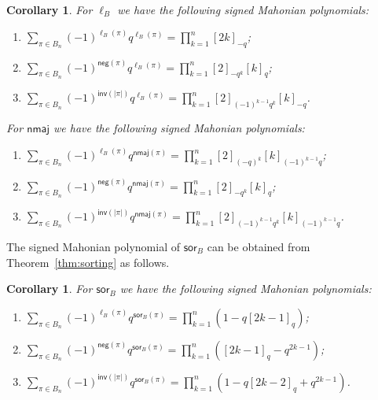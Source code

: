 \documentclass[a4paper, reqno, 11pt]{amsart}
\newtheorem{cor}[lem]{Corollary}
\newcommand{\inv}{{\textsf{inv}}}
\newcommand{\nega}{{\textsf{neg}}}
\newcommand{\nmaj}{{\textsf{nmaj}}}
\newcommand{\sor}{{\textsf{sor}}}
\numberwithin{equation}{section}
\renewcommand{\d}{\displaystyle}
\begin{document}
\begin{cor}
For $\ell_B$ we have the following signed Mahonian polynomials:
\begin{enumerate}

\item $\d\sum_{\pi\in B_n}(-1)^{\ell_B(\pi)}q^{\ell_B(\pi)}=\prod_{k=1}^n[2k]_{-q}$;
\item $\d\sum_{\pi\in B_n}(-1)^{\nega(\pi)}q^{\ell_B(\pi)}=\prod_{k=1}^n[2]_{-q^k}[k]_q$;
\item $\d\sum_{\pi\in B_n}(-1)^{\inv(|\pi|)}q^{\ell_B(\pi)}=\prod_{k=1}^n[2]_{(-1)^{k-1}q^k}[k]_{-q}$.

\end{enumerate}
For $\nmaj$ we have the following signed Mahonian polynomials:
\begin{enumerate}

\item $\d\sum_{\pi\in B_n}(-1)^{\ell_B(\pi)}q^{\nmaj(\pi)} =\prod_{k=1}^n[2]_{(-q)^k}[k]_{(-1)^{k-1}q}$;
\item $\d\sum_{\pi\in B_n}(-1)^{\nega(\pi)}q^{\nmaj(\pi)}=\prod_{k=1}^n[2]_{-q^k}[k]_q$;
\item $\d\sum_{\pi\in B_n}(-1)^{\inv(|\pi|)}q^{\nmaj(\pi)}=\prod_{k=1}^n[2]_{(-1)^{k-1}q^k}[k]_{(-1)^{k-1}q}$.

\end{enumerate}
\end{cor}



The signed Mahonian polynomial of $\sor_B$ can be obtained from Theorem~\ref{thm:sorting} as follows.
\begin{cor}
For $\sor_B$ we have the following signed Mahonian polynomials:
\begin{enumerate}
\item $\d\sum_{\pi\in B_n}(-1)^{\ell_B(\pi)}q^{\sor_B(\pi)}=\prod_{k=1}^n \left( 1-q[2k-1]_q \right)$;
\item $\d\sum_{\pi\in B_n}(-1)^{\nega(\pi)}q^{\sor_B(\pi)}=\prod_{k=1}^n \left( [2k-1]_q-q^{2k-1} \right)$;
\item $\d\sum_{\pi\in B_n}(-1)^{\inv(|\pi|)}q^{\sor_B(\pi)}=\prod_{k=1}^n \left( 1-q[2k-2]_q+q^{2k-1} \right)$.
\end{enumerate}
\end{cor}
\end{document}

